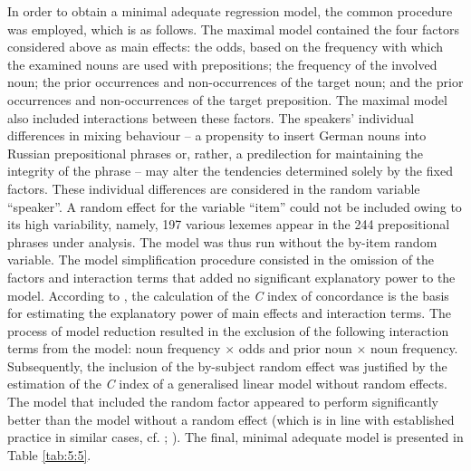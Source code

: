 In order to obtain a minimal adequate regression model, the common procedure \citep{baayen-2013,szmrecsanyi-2013} was employed, which is as follows. The maximal model contained the four factors considered above as main effects: the odds, based on the frequency with which the examined nouns are used with prepositions; the frequency of the involved noun; the prior occurrences and non-occurrences of the target noun; and the prior occurrences and non-occurrences of the target preposition. The maximal model also included interactions between these factors. The speakers' individual differences in mixing behaviour -- a propensity to insert German nouns into Russian prepositional phrases or, rather, a predilection for maintaining the integrity of the phrase  --  may alter the tendencies determined solely by the fixed factors. These individual differences are considered in the random variable “speaker”. A random effect for the variable “item” could not be included owing to its high variability, namely, 197 various lexemes appear in the 244 prepositional phrases under analysis. The model was thus run without the by-item random variable. The model simplification procedure consisted in the omission of the factors and interaction terms that added no significant explanatory power to the model. According to \cite[281]{baayen-analyzing}, the calculation of the \textit{C} index of concordance is the basis for estimating the explanatory power of main effects and interaction terms. The process of model reduction resulted in the exclusion of the following interaction terms from the model: noun frequency \(\times\) odds and prior noun \(\times\) noun frequency. Subsequently, the inclusion of the by-subject random effect was justified by the estimation of the \textit{C} index of a generalised linear model without random effects. The model that included the random factor appeared to perform significantly better than the model without a random effect (which is in line with established practice in similar cases, cf. \citealt{bresnan-etal}; \citealt{tagliamonte-baayen-2012}). The final, minimal adequate model is presented in Table \ref{tab:5:5}.

